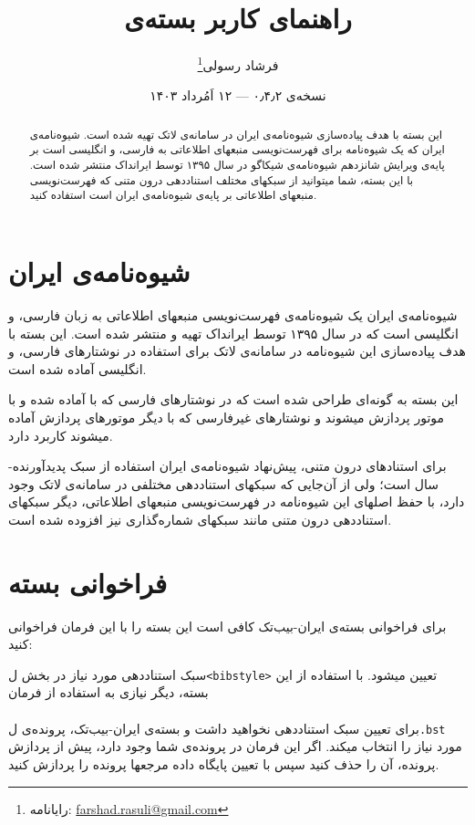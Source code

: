 \documentclass[a4paper,11pt]{article}
\begin{document}
\title{راهنمای کاربر بسته‌ی }
\author{فرشاد رسولی\thanks{رایانامه: \url{farshad.rasuli@gmail.com}}}
\date{نسخه‌ی ۰٫۴٫۲ --- ۱۲ اَمُرداد ۱۴۰۳}
\maketitle


\begin{abstract}
این بسته با هدف پیاده‌سازی شیوه‌نامه‌ی ایران در سامانه‌ی لاتک تهیه شده است. شیوه‌نامه‌ی ایران که یک شیوه‌نامه برای فهرست‌نویسی منبعهای اطلاعاتی به فارسی، و انگلیسی است بر پایه‌ی ویرایش شانزدهم شیوه‌نامه‌ی شیکاگو در سال ۱۳۹۵ توسط ایرانداک منتشر شده است. با این بسته، شما میتوانید از سبکهای مختلف استناددهی درون متنی که فهرست‌نویسی منبعهای اطلاعاتی بر پایه‌ی شیوه‌نامه‌ی ایران است استفاده کنید.
\end{abstract}



\section{شیوه‌نامه‌ی ایران}
شیوه‌نامه‌ی ایران یک شیوه‌نامه‌ی فهرست‌نویسی منبعهای اطلاعاتی به زبان فارسی، و انگلیسی است که در سال ۱۳۹۵ توسط ایرانداک تهیه و منتشر شده است. این بسته با هدف پیاده‌سازی این شیوه‌نامه در سامانه‌ی لاتک برای استفاده در نوشتارهای فارسی، و انگلیسی آماده شده است.


این بسته به گونه‌ای طراحی شده است که در نوشتارهای فارسی که با \XePersian{} آماده شده و با موتور \XeTeX{} پردازش میشوند و نوشتارهای غیرفارسی که با دیگر موتورهای پردازش آماده میشوند کاربرد دارد.


برای استنادهای درون متنی، پیش‌نهاد شیوه‌نامه‌ی ایران استفاده از سبک پدیدآورنده-سال است؛ ولی از آن‌جایی که سبکهای استناددهی مختلفی در سامانه‌ی لاتک وجود دارد، با حفظ اصلهای این شیوه‌نامه در فهرست‌نویسی منبعهای اطلاعاتی، دیگر سبکهای استناددهی درون متنی مانند سبکهای شماره‌گذاری نیز افزوده شده است.


\section{فراخوانی بسته}
برای فراخوانی بسته‌ی ایران-بیب‌تک کافی است این بسته را با این فرمان فراخوانی کنید:\\
\hspace*{\fill}


سبک استناددهی مورد نیاز در بخش \م‌ل{\tt <bibstyle>} تعیین میشود. با استفاده از این بسته، دیگر نیازی به استفاده از فرمان\\
\hspace*{\fill}\\
برای تعیین سبک استناددهی نخواهید داشت و بسته‌ی ایران-بیب‌تک، پرونده‌ی \م‌ل{\tt *.bst} مورد نیاز را انتخاب میکند. اگر این فرمان در پرونده‌ی شما وجود دارد، پیش از پردازش پرونده، آن را حذف کنید سپس با تعیین پایگاه داده مرجعها پرونده را پردازش کنید.
\end{document}
